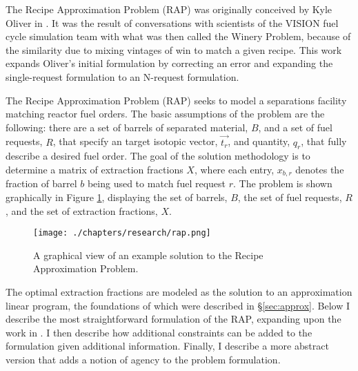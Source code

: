 The Recipe Approximation Problem (RAP) was originally conceived by Kyle Oliver
in \cite{oliver_geniusv2:_2009}. It was the result of conversations with
scientists of the VISION fuel cycle simulation team \cite{vision2009} with what
was then called the Winery Problem, because of the similarity due to mixing
vintages of win to match a given recipe. This work expands Oliver's initial
formulation by correcting an error and expanding the single-request formulation
to an N-request formulation.

The Recipe Approximation Problem (RAP) seeks to model a separations facility
matching reactor fuel orders. The basic assumptions of the problem are the
following: there are a set of barrels of separated material, $B$, and a set of
fuel requests, $R$, that specify an target isotopic vector, $\vec{t_{r}}$, and
quantity, $q_{r}$, that fully describe a desired fuel order. The goal of the
solution methodology is to determine a matrix of extraction fractions $X$, where
each entry, $x_{b,r}$ denotes the fraction of barrel $b$ being used to match
fuel request $r$. The problem is shown graphically in Figure \ref{fig:rap},
displaying the set of barrels, $B$, the set of fuel requests, $R$, and the set
of extraction fractions, $X$.

\begin{figure}[h]
  \begin{center}
    \texttt{[image: ./chapters/research/rap.png]}
  \caption{A graphical view of an example solution to the Recipe Approximation 
           Problem.}
  \label{fig:rap}
  \end{center}
\end{figure}

The optimal extraction fractions are modeled as the solution to an
approximation linear program, the foundations of which were described in
\S\ref{sec:approx}. Below I describe the most straightforward formulation of 
the RAP, expanding upon the work in \cite{oliver_geniusv2:_2009}. I then
describe how additional constraints can be added to the formulation given
additional information. Finally, I describe a more abstract version that adds a
notion of agency to the problem formulation.
